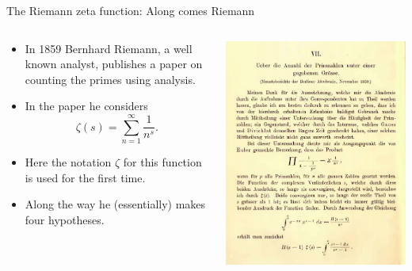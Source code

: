 \documentclass{beamer}
\begin{document}
\begin{frame}{The Riemann zeta function: Along comes Riemann}
\begin{columns}
\begin{column}{.575\textwidth}
\begin{itemize}
\item In 1859 Bernhard Riemann, a well known analyst, publishes a paper on counting the primes using analysis.
\item<2-> In the paper he considers
\[
\zeta(s) = \sum_{n=1}^{\infty} \frac{1}{n^s}.
\]
\item<3-> Here the notation $\zeta$ for this function is used for the first time.
\item<4-> Along the way he (essentially) makes four hypotheses.
\end{itemize}
\end{column}
\begin{column}{.425\textwidth}
\includegraphics[width=\textwidth]{img/ueber}
\end{column}
\end{columns}
\end{frame}
\end{document}
